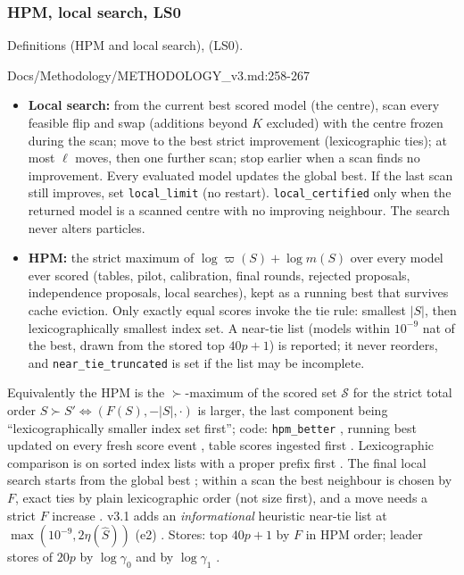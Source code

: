 \subsubsection{HPM, local search, LS0}
Definitions  (HPM and local search),  (LS0).
\begin{stmt}{Docs/Methodology/METHODOLOGY_v3.md:258-267}
\begin{itemize}
\item \textbf{Local search:} from the current best scored model (the centre), scan every feasible flip and swap (additions beyond $K$
  excluded) with the centre frozen during the scan; move to the best strict improvement (lexicographic ties); at most $\ell$ moves,
  then one further scan; stop earlier when a scan finds no improvement. Every evaluated model updates the global best. If the
  last scan still improves, set \texttt{local\_limit} (no restart). \texttt{local\_certified} only when the returned model is a scanned
  centre with no improving neighbour. The search never alters particles.
\item \textbf{HPM:} the strict maximum of $\log\varpi(S)+\log m(S)$ over every model ever scored (tables, pilot, calibration, final rounds,
  rejected proposals, independence proposals, local searches), kept as a running best that survives cache eviction. Only exactly
  equal scores invoke the tie rule: smallest $|S|$, then lexicographically smallest index set. A near-tie list (models within
  $10^{-9}$ nat of the best, drawn from the stored top $40p+1$) is reported; it never reorders, and \texttt{near\_tie\_truncated} is set
  if the list may be incomplete.
\end{itemize}
\end{stmt}
Equivalently the HPM is the $\succ$-maximum of the scored set $\mathcal S$ for the strict total order
$S\succ S'\iff(F(S),-|S|,\cdot)$ is larger, the last component being ``lexicographically smaller index set first''; code:
\texttt{hpm\_better} , running best
updated on every fresh score event ,
table scores ingested first .
Lexicographic comparison is on sorted index lists with a proper prefix first
. The final local search starts from
the global best ; within a scan the best
neighbour is chosen by $F$, exact ties by plain lexicographic order (not size first), and a move needs a strict $F$ increase
. v3.1 adds an \emph{informational}
heuristic near-tie list at $\max(10^{-9},2\eta(\hat S))$ (e2) .
Stores: top $40p+1$ by $F$ in HPM order; leader stores of $20p$ by $\log\gamma_0$ and by $\log\gamma_1$
.

